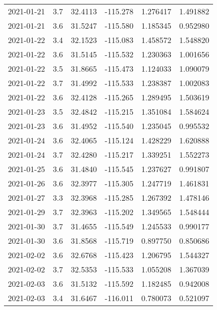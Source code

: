 \begin{tabular}{lrrrrr}
2021-01-21 &       3.7 &  32.4113 &  -115.278 &         1.276417 &         1.491882 \\
2021-01-21 &       3.6 &  31.5247 &  -115.580 &         1.185345 &         0.952980 \\
2021-01-22 &       3.4 &  32.1523 &  -115.083 &         1.458572 &         1.548820 \\
2021-01-22 &       3.6 &  31.5145 &  -115.532 &         1.230363 &         1.001656 \\
2021-01-22 &       3.5 &  31.8665 &  -115.473 &         1.124033 &         1.090079 \\
2021-01-22 &       3.7 &  31.4992 &  -115.533 &         1.238387 &         1.002083 \\
2021-01-22 &       3.6 &  32.4128 &  -115.265 &         1.289495 &         1.503619 \\
2021-01-23 &       3.5 &  32.4842 &  -115.215 &         1.351084 &         1.584624 \\
2021-01-23 &       3.6 &  31.4952 &  -115.540 &         1.235045 &         0.995532 \\
2021-01-24 &       3.6 &  32.4065 &  -115.124 &         1.428229 &         1.620888 \\
2021-01-24 &       3.7 &  32.4280 &  -115.217 &         1.339251 &         1.552273 \\
2021-01-25 &       3.6 &  31.4840 &  -115.545 &         1.237627 &         0.991807 \\
2021-01-26 &       3.6 &  32.3977 &  -115.305 &         1.247719 &         1.461831 \\
2021-01-27 &       3.3 &  32.3968 &  -115.285 &         1.267392 &         1.478146 \\
2021-01-29 &       3.7 &  32.3963 &  -115.202 &         1.349565 &         1.548444 \\
2021-01-30 &       3.7 &  31.4655 &  -115.549 &         1.245533 &         0.990177 \\
2021-01-30 &       3.6 &  31.8568 &  -115.719 &         0.897750 &         0.850686 \\
2021-02-02 &       3.6 &  32.6768 &  -115.423 &         1.206795 &         1.544327 \\
2021-02-02 &       3.7 &  32.5353 &  -115.533 &         1.055208 &         1.367039 \\
2021-02-03 &       3.6 &  31.5132 &  -115.592 &         1.182485 &         0.942008 \\
2021-02-03 &       3.4 &  31.6467 &  -116.011 &         0.780073 &         0.521097 \\

\end{tabular}
